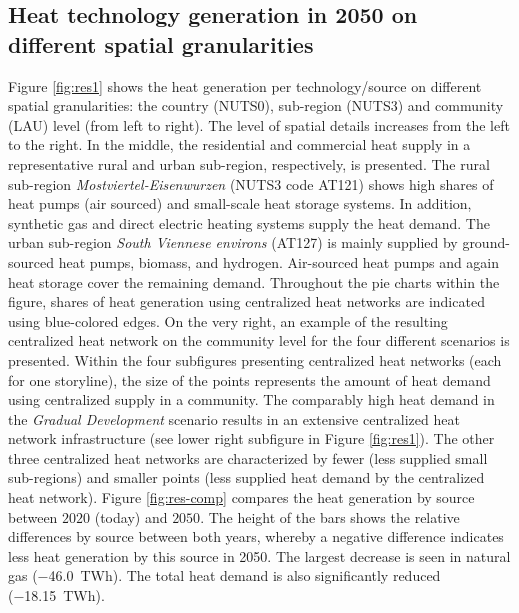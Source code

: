 \subsection{Heat technology generation in 2050 on different spatial granularities}\label{res:2}
Figure \ref{fig:res1} shows the heat generation per technology/source on different spatial granularities: the country (NUTS0), sub-region (NUTS3) and community (LAU) level (from left to right). The level of spatial details increases from the left to the right. In the middle, the residential and commercial heat supply in a representative rural and urban sub-region, respectively, is presented. The rural sub-region \textit{Mostviertel-Eisenwurzen} (NUTS3 code AT121) shows high shares of heat pumps (air sourced) and small-scale heat storage systems. In addition, synthetic gas and direct electric heating systems supply the heat demand. The urban sub-region \textit{South Viennese environs} (AT127) is mainly supplied by ground-sourced heat pumps, biomass, and hydrogen. Air-sourced heat pumps and again heat storage cover the remaining demand. Throughout the pie charts within the figure, shares of heat generation using centralized heat networks are indicated using blue-colored edges. On the very right, an example of the resulting centralized heat network on the community level for the four different scenarios is presented. Within the four subfigures presenting centralized heat networks (each for one storyline), the size of the points represents the amount of heat demand using centralized supply in a community. The comparably high heat demand in the \textit{Gradual Development} scenario results in an extensive centralized heat network infrastructure (see lower right subfigure in Figure \ref{fig:res1}). The other three centralized heat networks are characterized by fewer (less supplied small sub-regions) and smaller points (less supplied heat demand by the centralized heat network). Figure \ref{fig:res-comp} compares the heat generation by source between $2020$ (today) and $2050$. The height of the bars shows the relative differences by source between both years, whereby a negative difference indicates less heat generation by this source in 2050. The largest decrease is seen in natural gas (\SI{-46.0}{TWh}). The total heat demand is also significantly reduced (\SI{-18.15}{TWh}).

